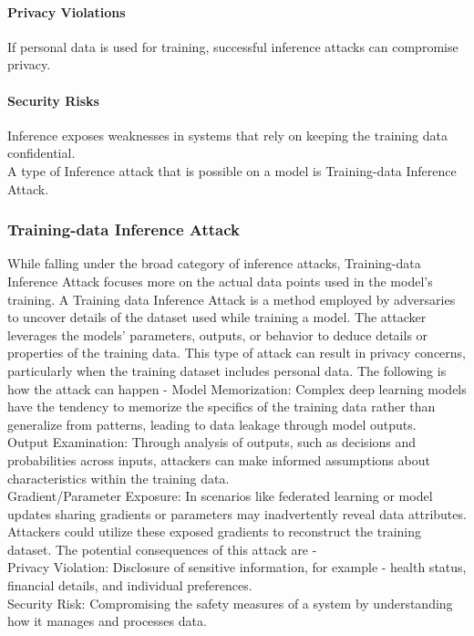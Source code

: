 \documentclass[conference]{IEEEtran}
\begin{document}
\paragraph{Privacy Violations} If personal data is used for training, successful inference attacks can compromise privacy. 
\paragraph{Security Risks} Inference exposes weaknesses in systems that rely on keeping the training data confidential.\\
A type of Inference attack that is possible on a model is Training-data Inference Attack.
\subsubsection{Training-data Inference Attack}
While falling under the broad category of inference attacks, Training-data Inference Attack focuses more on the actual data points used in the model’s training.
A Training data Inference Attack is a method employed by adversaries to uncover details of the dataset used while training a model. The attacker leverages the models’ parameters, outputs, or behavior to deduce details or properties of the training data. This type of attack can result in privacy concerns, particularly when the training dataset includes personal data. The following is how the attack can happen - 
Model Memorization: Complex deep learning models have the tendency to memorize the specifics of the training data rather than generalize from patterns, leading to data leakage through model outputs. \\
Output Examination: Through analysis of outputs, such as decisions and probabilities across inputs, attackers can make informed assumptions about characteristics within the training data. \\
Gradient/Parameter Exposure: In scenarios like federated learning or model updates sharing gradients or parameters may inadvertently reveal data attributes. Attackers could utilize these exposed gradients to reconstruct the training dataset. 
The potential consequences of this attack are - \\
Privacy Violation: Disclosure of sensitive information, for example - health status, financial details, and individual preferences.\\ 
Security Risk: Compromising the safety measures of a system by understanding how it manages and processes data. 
\\
\end{document}
